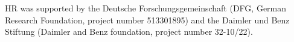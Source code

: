 
HR was supported by the Deutsche Forschungsgemeinschaft
(DFG, German Research Foundation, project number 513301895)
and the Daimler und Benz Stiftung (Daimler and Benz foundation,
project number 32-10/22).
